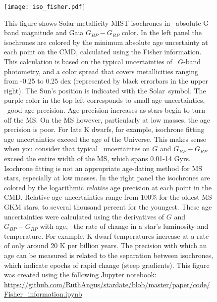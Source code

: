 \begin{figure}
  \caption{
    This figure shows Solar-metallicity MIST isochrones in \Gaia\ absolute
    G-band magnitude and Gaia $G_{BP} - G_{RP}$ color.
    In the left panel the isochrones are colored by the minimum absolute age
    uncertainty at each point on the CMD, calculated using the Fisher
    information.
    This calculation is based on the typical uncertainties of
    \Gaia\ $G$-band photometry, and a color spread that covers metallicities
    ranging from -0.25 to 0.25 dex (represented by black errorbars in the
    upper right).
    The Sun's position \citep{casagrande2018} is indicated with the Solar\
    symbol.
    The purple color in the top left corresponds to small age uncertainties,
    \ie\ good age precision.
    Age precision increases as stars begin to turn off the MS.
    On the MS however, particularly at low masses, the age precision is poor.
    For late K dwarfs, for example, isochrone fitting age uncertainties exceed
    the age of the Universe.
    This makes sense when you consider that typical \Gaia\ uncertaintes on $G$
    and $G_{BP} - G_{RP}$ exceed the entire width of the MS, which spans
    0.01-14 Gyrs.
    Isochrone fitting is not an appropriate age-dating method for MS stars,
    especially at low masses.
    In the right panel the isochrones are colored by the logarithmic
    {\it relative} age precision at each point in the CMD.
    Relative age uncertainties range from 100\% for the oldest MS GKM stars,
    to several thousand percent for the youngest.
    These age uncertainties were calculated using the derivatives of $G$ and
    $G_{BP} - G_{RP}$ with age, \ie\ the rate of change in a star's luminosity
    and temperature.
    For example, K dwarf temperatures increase at a rate of only around 20 K
    per billion years.
    The precision with which an age can be measured is related to the
    separation between isochrones, which indicate epochs of rapid change
    (steep gradients).
    This figure was created using the following Jupyter notebook:
    \url{https://github.com/RuthAngus/stardate/blob/master/paper/code/Fisher_information.ipynb}
    \label{fig:fischer_iso}
}
  \centering
    \texttt{[image: iso\_fisher.pdf]}
\label{fig:iso_fisher}
\end{figure}

